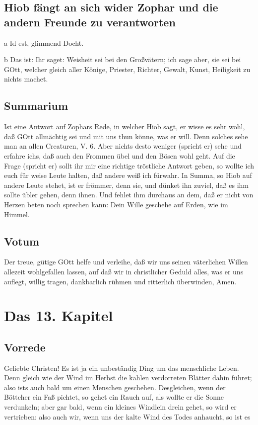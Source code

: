 \section[Hiob fängt an sich wider Zophar und die]{Hiob fängt an sich wider Zophar und die andern Freunde zu verantworten}

a Id est, glimmend Docht.

b Das ist: Ihr saget: Weisheit sei bei den Großvätern; ich sage aber, sie sei bei GOtt, welcher gleich aller Könige, Priester, Richter, Gewalt, Kunst, Heiligkeit zu nichts machet.

\section{Summarium}

Ist eine Antwort auf Zophars Rede, in welcher Hiob sagt, er wisse es sehr wohl, daß GOtt allmächtig sei und mit uns thun könne, was er will. Denn solches sehe man an allen Creaturen, V. 6. Aber nichts desto weniger (spricht er) sehe und erfahre ichs, daß auch den Frommen übel und den Bösen wohl geht. Auf die Frage (spricht er) sollt ihr mir eine richtige tröstliche Antwort geben, so wollte ich euch für weise Leute halten, daß andere weiß ich fürwahr. In Summa, so Hiob auf andere Leute stehet, ist er frömmer, denn sie, und dünket ihn zuviel, daß es ihm sollte übler gehen, denn ihnen. Und fehlet ihm durchaus an dem, daß er nicht von Herzen beten noch sprechen kann: Dein Wille geschehe auf Erden, wie im Himmel.

\section{Votum}

Der treue, gütige GOtt helfe und verleihe, daß wir uns seinen väterlichen Willen allezeit wohlgefallen lassen, auf daß wir in christlicher Geduld alles, was er uns auflegt, willig tragen, dankbarlich rühmen und ritterlich überwinden, Amen.

\chapter{Das 13. Kapitel}

\section{Vorrede}

Geliebte Christen! Es ist ja ein unbeständig Ding um das menschliche Leben. Denn gleich wie der Wind im Herbst die kahlen verdorreten Blätter dahin führet; also ists auch bald um einen Menschen geschehen. Desgleichen, wenn der Böttcher ein Faß pichtet, so gehet ein Rauch auf, als wollte er die Sonne verdunkeln; aber gar bald, wenn ein kleines Windlein drein gehet, so wird er vertrieben: also auch wir, wenn uns der kalte Wind des Todes anhaucht, so ist es

